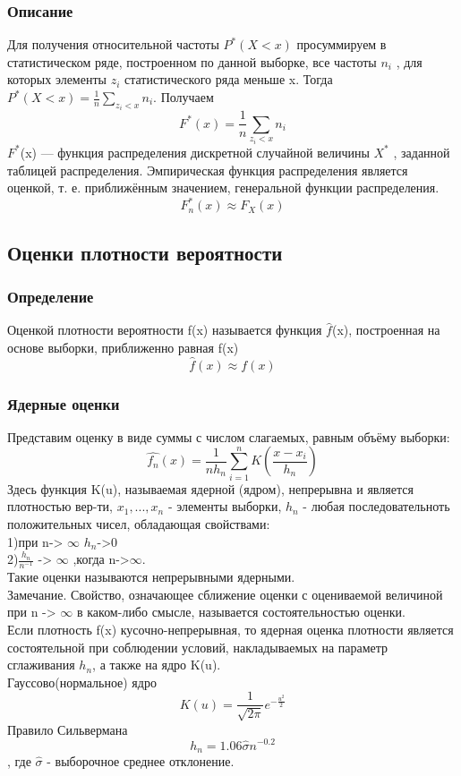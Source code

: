 \documentclass[a4]{article}
\begin{document}
			\subsubsection{Описание}
				Для получения относительной частоты $P^*(X<x)$ просуммируем в статистическом ряде, построенном по данной выборке, все частоты $n_i$ , для
				которых элементы $z_i$ статистического ряда меньше x. Тогда $P^*(X<x) = \frac{1}{n}\sum_{z_i<x}n_i $. Получаем\\
				$$F^*(x) = \frac{1}{n}\sum_{z_i<x}n_i$$
				$F^*$(x) — функция распределения дискретной случайной величины $X^*$
				, заданной таблицей распределения.
				Эмпирическая функция распределения является оценкой, т. е. приближённым значением, генеральной функции распределения.
				$$F^*_n(x) \approx F_X(x)$$
				
		\subsection{Оценки плотности вероятности}
			\subsubsection{Определение}
				Оценкой плотности вероятности f(x) называется функция $\hat{f}$(x), построенная на основе выборки, приближенно равная f(x) $$\hat{f}(x) \approx f(x)$$
			\subsubsection{Ядерные оценки}
			Представим оценку в виде суммы с числом слагаемых, равным объёму выборки: 
			$$\hat{f_n}(x) = \frac{1}{n h_n} \sum_{i = 1}^{n} K(\frac{x - x_i}{h_n})$$
			Здесь функция K(u), называемая ядерной (ядром), непрерывна и является плотностью вер-ти, $x_1, ..., x_n$ - элементы выборки, {$h_n$} - любая последовательноть положительных чисел, обладающая свойствами:\\
			1)при n-> $\infty$ $h_n$->0\\
			2)$\frac{h_n}{n^{-1}}$ -> $\infty$ ,когда n->$\infty$.\\
			Такие оценки называются непрерывными ядерными.\\
			
			Замечание. Свойство, означающее сближение оценки с оцениваемой величиной при n -> $\infty$ в каком-либо смысле, называется состоятельностью оценки.\\
			Если плотность f(x) кусочно-непрерывная, то ядерная оценка плотности
			является состоятельной при соблюдении условий, накладываемых на параметр сглаживания $h_n$, а также на ядро K(u).\\
			Гауссово(нормальное) ядро$$K(u) = \frac{1}{\sqrt{2 \pi}} e^{-\frac{u^2}{2}}$$
			Правило Сильвермана
			 $$h_n = 1.06 \hat{\sigma} n^{-0.2}$$, где $\hat{\sigma}$ - выборочное среднее отклонение.
		
\end{document}
